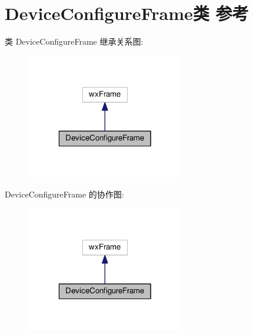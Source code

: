 \hypertarget{class_device_configure_frame}{\section{Device\+Configure\+Frame类 参考}
\label{class_device_configure_frame}
}


类 Device\+Configure\+Frame 继承关系图\+:
\nopagebreak
\begin{figure}[H]
\begin{center}
\leavevmode
\includegraphics[width=196pt]{class_device_configure_frame__inherit__graph}
\end{center}
\end{figure}


Device\+Configure\+Frame 的协作图\+:
\nopagebreak
\begin{figure}[H]
\begin{center}
\leavevmode
\includegraphics[width=196pt]{class_device_configure_frame__coll__graph}
\end{center}
\end{figure}
